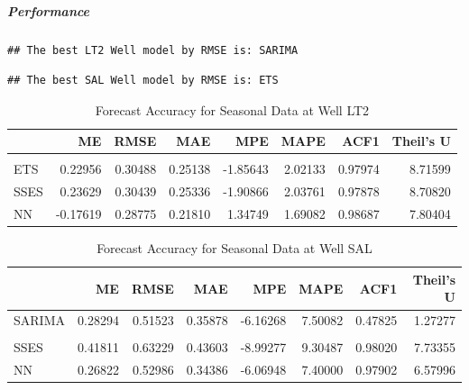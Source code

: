 \documentclass[
]{article}
\begin{document}
\hypertarget{performance}{%
\subparagraph{Performance}\label{performance}}

\begin{verbatim}
## The best LT2 Well model by RMSE is: SARIMA
\end{verbatim}

\begin{verbatim}
## The best SAL Well model by RMSE is: ETS
\end{verbatim}

\begin{table}
\centering\centering
\caption{\label{tab:Comparing Performance Metrics}Forecast Accuracy for Seasonal Data at Well LT2}
\centering
\begin{tabular}[t]{l|r|r|r|r|r|r|r}
\hline
  & ME & RMSE & MAE & MPE & MAPE & ACF1 & Theil's U\\
\hline
\cellcolor{gray!10}{SARIMA} & \cellcolor{gray!10}{0.18533} & \cellcolor{gray!10}{0.25429} & \cellcolor{gray!10}{0.20708} & \cellcolor{gray!10}{-1.50064} & \cellcolor{gray!10}{1.66526} & \cellcolor{gray!10}{0.78460} & \cellcolor{gray!10}{1.76030}\\
\hline
ETS & 0.22956 & 0.30488 & 0.25138 & -1.85643 & 2.02133 & 0.97974 & 8.71599\\
\hline
SSES & 0.23629 & 0.30439 & 0.25336 & -1.90866 & 2.03761 & 0.97878 & 8.70820\\
\hline
NN & -0.17619 & 0.28775 & 0.21810 & 1.34749 & 1.69082 & 0.98687 & 7.80404\\
\hline
\end{tabular}
\end{table}

\begin{table}
\centering\centering
\caption{\label{tab:Comparing Performance Metrics}Forecast Accuracy for Seasonal Data at Well SAL}
\centering
\begin{tabular}[t]{l|r|r|r|r|r|r|r}
\hline
  & ME & RMSE & MAE & MPE & MAPE & ACF1 & Theil's U\\
\hline
SARIMA & 0.28294 & 0.51523 & 0.35878 & -6.16268 & 7.50082 & 0.47825 & 1.27277\\
\hline
\cellcolor{gray!10}{ETS} & \cellcolor{gray!10}{0.18165} & \cellcolor{gray!10}{0.40155} & \cellcolor{gray!10}{0.24084} & \cellcolor{gray!10}{-4.12608} & \cellcolor{gray!10}{5.22038} & \cellcolor{gray!10}{0.96610} & \cellcolor{gray!10}{5.06406}\\
\hline
SSES & 0.41811 & 0.63229 & 0.43603 & -8.99277 & 9.30487 & 0.98020 & 7.73355\\
\hline
NN & 0.26822 & 0.52986 & 0.34386 & -6.06948 & 7.40000 & 0.97902 & 6.57996\\
\hline
\end{tabular}
\end{table}
\end{document}

